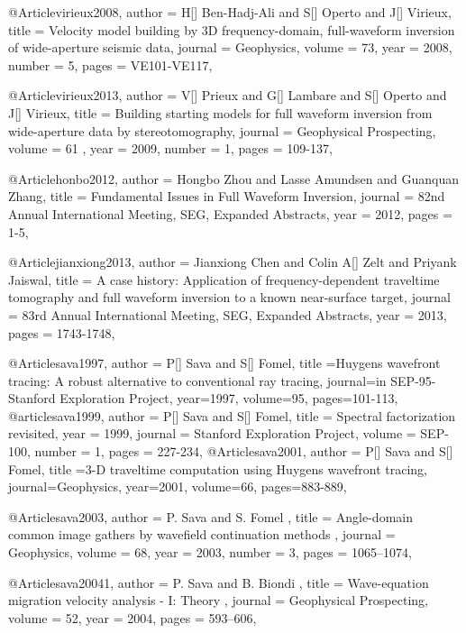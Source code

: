 @Article{virieux2008,
  author =	 { H[] Ben-Hadj-Ali and S[] Operto and J[] Virieux},
  title =	 {Velocity model building by 3{D} frequency-domain, full-waveform inversion of wide-aperture seismic data},
  journal =	 {Geophysics},
  volume =	 73,
  year =	 2008,
  number =	 5,
  pages =	 {VE101-VE117},
}

@Article{virieux2013,
  author =	 { V[] Prieux and G[] Lambare  and S[] Operto and J[] Virieux},
  title =	 {Building starting models for full waveform inversion from wide-aperture data by stereotomography},
  journal =	 {Geophysical Prospecting},
  volume =	61 ,
  year =	 2009,
  number =	 1,
  pages =	 {109-137},
}



@Article{honbo2012,
  author = 	 {Hongbo Zhou and Lasse Amundsen and Guanquan Zhang},
  title = 	 {Fundamental Issues in Full Waveform Inversion},
  journal = 	 {82nd Annual International Meeting, SEG, Expanded Abstracts},
  year = 	 2012,
  pages =	 {1-5},
}

@Article{jianxiong2013,
  author = 	 {Jianxiong Chen and Colin A[] Zelt and Priyank Jaiswal},
  title = 	 {A case history: Application of frequency-dependent traveltime tomography and full waveform
inversion to a known near-surface target},
  journal = 	 {83rd Annual International Meeting, SEG, Expanded Abstracts},
  year = 	 2013,
  pages =	 {1743-1748},
}

@Article{sava1997,
  author = {P[] Sava and S[] Fomel},
  title ={Huygens wavefront tracing: A robust alternative to conventional ray tracing},
  journal={in SEP-95-Stanford Exploration Project},
  year=1997,
  volume=95,
  pages={101-113},
}
@article{sava1999,
  author =	 {P[] Sava and S[] Fomel},
  title =	 {Spectral factorization revisited},
  year =	 1999,
  journal =	 {Stanford Exploration Project},
  volume =	 SEP-100,
  number =	 1,
  pages =	 {227-234},
}
@Article{sava2001,
  author = {P[] Sava and S[] Fomel},
  title ={3-D traveltime computation using Huygens wavefront tracing},
  journal={Geophysics},
  year=2001,
  volume=66,
  pages={883-889},
}

@Article{sava2003,
  author =	 { P. Sava and S. Fomel },
  title =	 { Angle-domain common image gathers by wavefield
                  continuation methods },
  journal =	 {Geophysics},
  volume =	 68,
  year =	 2003,
  number =	 3,
  pages =	 {1065--1074},
}

@Article{sava20041,
 author =  { P. Sava and B. Biondi },
 title =   { Wave-equation migration velocity analysis - {I}: {Theory} },
 journal = {Geophysical Prospecting},
 volume = {52},
 year =   {2004},
 pages =  {593--606},
}

